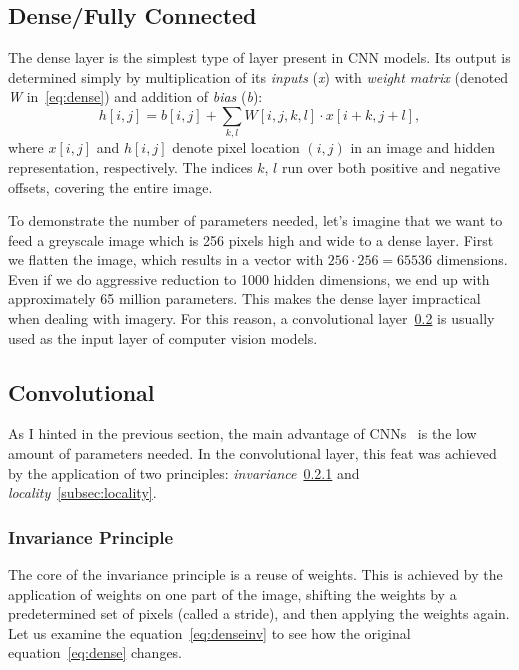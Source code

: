 \subsection{Dense/Fully Connected}\label{subsec:dense}
The dense layer is the simplest type of layer present in CNN models.
Its output is determined simply by multiplication of its \textit{inputs} (\textit{x}) with \textit{weight matrix}
(denoted \textit{W} in~\ref{eq:dense}) and addition of \textit{bias} (\textit{b}):
\begin{equation}
    \label{eq:dense}
    h[i, j] = b[i,j] + \sum_{k,l} W[i,j,k,l] \cdot x[i+k,j+l],
\end{equation}
where $x\left[ i, j \right]$ and $h\left[ i, j \right]$ denote pixel location $\left( i, j \right)$ in an image and
hidden representation, respectively.
The indices $k$, $l$ run over both positive and negative offsets, covering the entire image.

To demonstrate the number of parameters needed, let's imagine that we want to feed a greyscale image which is 256 pixels
high and wide to a dense layer.
First we flatten the image, which results in a vector with $256\cdot256 = 65536$ dimensions.
Even if we do aggressive reduction to 1000 hidden dimensions, we end up with approximately 65 million parameters.
This makes the dense layer impractical when dealing with imagery.
For this reason, a convolutional layer~\ref{subsec:convolutional} is usually used as the input layer of computer
vision models.

\subsection{Convolutional}\label{subsec:convolutional}
As I hinted in the previous section, the main advantage of CNNs~\cite{ConvLayer} is the low amount of parameters needed.
In the convolutional layer, this feat was achieved by the application of two principles:
\textit{invariance}~\ref{subsec:invariance} and \textit{locality}~\ref{subsec:locality}.

\subsubsection{Invariance Principle}\label{subsec:invariance}
The core of the invariance principle is a reuse of weights.
This is achieved by the application of weights on one part of the image, shifting the weights by a predetermined set
of pixels (called a stride), and then applying the weights again.
Let us examine the equation~\ref{eq:denseinv} to see how the original equation~\ref{eq:dense} changes.

